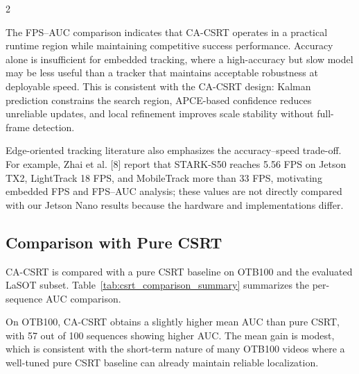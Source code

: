 \documentclass[10pt,a4paper]{article}
\begin{document}
\begin{multicols}{2}

The FPS--AUC comparison indicates that CA-CSRT operates in a practical runtime region while maintaining competitive success performance. Accuracy alone is insufficient for embedded tracking, where a high-accuracy but slow model may be less useful than a tracker that maintains acceptable robustness at deployable speed. This is consistent with the CA-CSRT design: Kalman prediction constrains the search region, APCE-based confidence reduces unreliable updates, and local refinement improves scale stability without full-frame detection.

Edge-oriented tracking literature also emphasizes the accuracy--speed trade-off. For example, Zhai et al. [8] report that STARK-S50 reaches 5.56 FPS on Jetson TX2, LightTrack 18 FPS, and MobileTrack more than 33 FPS, motivating embedded FPS and FPS--AUC analysis; these values are not directly compared with our Jetson Nano results because the hardware and implementations differ.

\subsection{Comparison with Pure CSRT}

CA-CSRT is compared with a pure CSRT baseline on OTB100 and the evaluated LaSOT subset. Table~\ref{tab:csrt_comparison_summary} summarizes the per-sequence AUC comparison.

\begin{center}
\scriptsize
{}
\label{tab:csrt_comparison_summary}
\end{center}

On OTB100, CA-CSRT obtains a slightly higher mean AUC than pure CSRT, with 57 out of 100 sequences showing higher AUC. The mean gain is modest, which is consistent with the short-term nature of many OTB100 videos where a well-tuned pure CSRT baseline can already maintain reliable localization.


\end{multicols}
\end{document}
